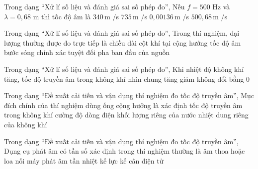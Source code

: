 \begin{ex}
Trong dạng “Xử lí số liệu và đánh giá sai số phép đo”, Nếu $f=500$ Hz và $\lambda=0,68$ m thì tốc độ âm là
\choice
{\True $340\,\text{m}$ /s}
{$735\,\text{m}$ /s}
{$0,00136\,\text{m}$ /s}
{$500,68\,\text{m}$ /s}
\end{ex}

\begin{ex}
Trong dạng “Xử lí số liệu và đánh giá sai số phép đo”, Trong thí nghiệm, đại lượng thường được đo trực tiếp là
\choice
{\True chiều dài cột khí tại cộng hưởng}
{tốc độ âm}
{bước sóng chính xác tuyệt đối}
{pha ban đầu của nguồn}
\end{ex}

\begin{ex}
Trong dạng “Xử lí số liệu và đánh giá sai số phép đo”, Khi nhiệt độ không khí tăng, tốc độ truyền âm trong không khí nhìn chung
\choice
{\True tăng}
{giảm}
{không đổi}
{bằng 0}
\end{ex}

\begin{ex}
Trong dạng “Đề xuất cải tiến và vận dụng thí nghiệm đo tốc độ truyền âm”, Mục đích chính của thí nghiệm dùng ống cộng hưởng là xác định
\choice
{\True tốc độ truyền âm trong không khí}
{cường độ dòng điện}
{khối lượng riêng của nước}
{nhiệt dung riêng của không khí}
\end{ex}

\begin{ex}
Trong dạng “Đề xuất cải tiến và vận dụng thí nghiệm đo tốc độ truyền âm”, Dụng cụ phát âm có tần số xác định trong thí nghiệm thường là
\choice
{\True âm thoa hoặc loa nối máy phát âm tần}
{nhiệt kế}
{lực kế}
{cân điện tử}
\end{ex}

